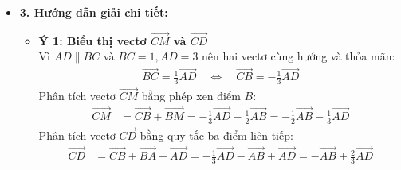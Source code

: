 \documentclass[12pt,a4paper]{article}
\begin{document}
\begin{itemize}
\begin{itemize}
        \item \textbf{3. Hướng dẫn giải chi tiết:}
        \begin{itemize}
            \item \textbf{Ý 1: Biểu thị vectơ $\vec{CM}$ và $\vec{CD}$}\\
            Vì $AD \parallel BC$ và $BC = 1, AD = 3$ nên hai vectơ cùng hướng và thỏa mãn:
            \begin{align*}
                \vec{BC} = \frac{1}{3}\vec{AD} \quad \Longleftrightarrow \quad \vec{CB} = -\frac{1}{3}\vec{AD}
            \end{align*}
            Phân tích vectơ $\vec{CM}$ bằng phép xen điểm $B$:
            \begin{align*}
                \vec{CM} &= \vec{CB} + \vec{BM} = -\frac{1}{3}\vec{AD} - \frac{1}{2}\vec{AB} = -\frac{1}{2}\vec{AB} - \frac{1}{3}\vec{AD}
            \end{align*}
            Phân tích vectơ $\vec{CD}$ bằng quy tắc ba điểm liên tiếp:
            \begin{align*}
                \vec{CD} &= \vec{CB} + \vec{BA} + \vec{AD} = -\frac{1}{3}\vec{AD} - \vec{AB} + \vec{AD} = -\vec{AB} + \frac{2}{3}\vec{AD}
            \end{align*}


\end{itemize}
\end{itemize}
\end{itemize}
\end{document}
